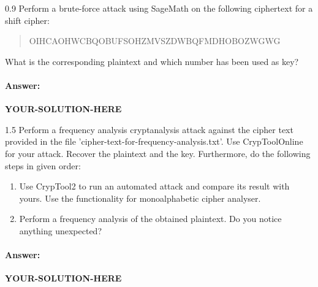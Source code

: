\documentclass[]{scrartcl}
\newcounter{exercise}
\newcounter{qid}[section]
\newcommand{\exerciseprefix}{prefix}
\newcommand{\questiontitle}{Questions}
\newcommand{\blockid}{B2}
\newcommand{\exname}{}
\newcommand{\cttwo}{CrypTool2}
\newcommand{\ctonline}{CrypToolOnline}
\newcommand{\yoursolutionhere}{\textbf{YOUR-SOLUTION-HERE}}
\begin{document}
\newcommand{\ciphertwo}{OIHCAOHWCBQOBUFSOHZMVSZDWBQFMDHOBOZWGWG}
\renewcommand{\exerciseprefix}{PS-\blockid{}-E\theexercise: \exname{}-Q\theqid}
\renewcommand{\questiontitle}{\exerciseprefix{}: Brute-force attack on shift cipher (II/II)}
\begin{exercisebox}{0.9}
Perform a brute-force attack using SageMath on the following ciphertext for a shift cipher:
\begin{quote}
    \ciphertwo{}
\end{quote}
What is the corresponding plaintext and which number has been used as key?
\end{exercisebox}

\paragraph{Answer:} \yoursolutionhere{}




\renewcommand{\exerciseprefix}{PS-\blockid{}-E\theexercise: \exname{}-Q\theqid}
\renewcommand{\questiontitle}{\exerciseprefix{}: Frequency analysis on shift cipher}
\begin{exercisebox}{1.5}
Perform a frequency analysis cryptanalysis attack against the cipher text provided in the file 'cipher-text-for-frequency-analysis.txt'. Use \ctonline{} for your attack.  
Recover the plaintext and the key. Furthermore, do the following steps in given order:
\begin{enumerate}
    \item Use \cttwo{} to run an automated attack and compare its result with yours. Use the functionality for monoalphabetic cipher analyser. 
    \item Perform a frequency analysis of the obtained plaintext. Do you notice anything unexpected?
\end{enumerate}
\end{exercisebox}

\paragraph{Answer:} \yoursolutionhere{}
\end{document}
